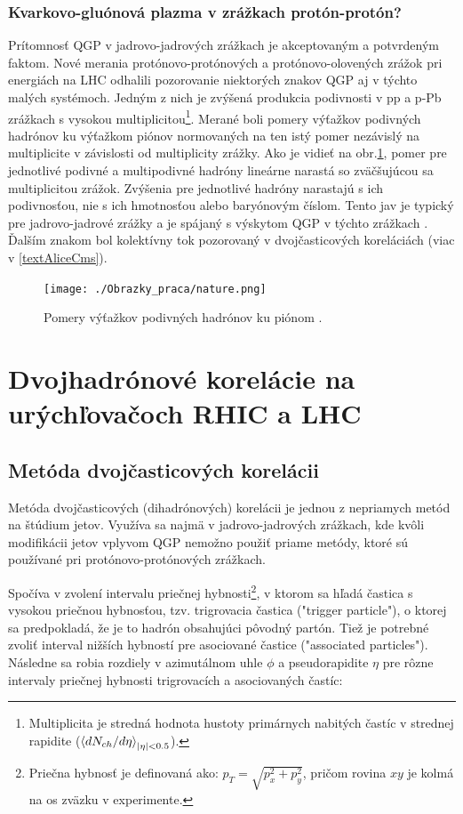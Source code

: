 \documentclass[thesismargins, thesislinespacing]{rnthesis}
\begin{document}
\subsection{Kvarkovo-gluónová plazma v zrážkach protón-protón?}
Prítomnosť QGP v jadrovo-jadrových zrážkach je akceptovaným a potvrdeným faktom. Nové merania protónovo-protónových a protónovo-olovených zrážok pri energiách na LHC odhalili pozorovanie niektorých znakov QGP aj v týchto malých systémoch. Jedným z nich je zvýšená produkcia podivnosti v pp a p-Pb zrážkach s vysokou multiplicitou\footnote{Multiplicita je stredná hodnota hustoty primárnych nabitých častíc v strednej rapidite   \newline  ($\braket{dN_{ch}/d\eta}_{|\eta|<0.5}$).}. Merané boli pomery výťažkov podivných hadrónov ku výťažkom piónov normovaných na ten istý pomer nezávislý na multiplicite v závislosti od multiplicity zrážky. Ako je vidieť na obr.\ref{strange}, pomer pre jednotlivé podivné a  multipodivné hadróny lineárne narastá so zväčšujúcou sa multiplicitou zrážok. Zvýšenia pre jednotlivé hadróny narastajú s ich podivnosťou, nie s ich hmotnosťou alebo baryónovým číslom. Tento jav je typický pre jadrovo-jadrové zrážky a je spájaný s výskytom QGP v týchto zrážkach \cite{nature}.  Ďalším znakom bol kolektívny tok pozorovaný v dvojčasticových koreláciách (viac v \ref{textAliceCms}).
\begin{figure}[hbtp!]
	\begin{center}
		\texttt{[image: ./Obrazky\_praca/nature.png]}
		\caption{ Pomery výťažkov podivných hadrónov ku piónom \cite{nature}.}
		\label{strange}
	\end{center}
\end{figure} 

\chapter{Dvojhadrónové korelácie na urýchľovačoch RHIC a LHC}

\section{Metóda dvojčasticových korelácii}
\label{korel}
Metóda dvojčasticových (dihadrónových) korelácii je jednou z nepriamych metód na štúdium jetov. Využíva sa najmä v jadrovo-jadrových zrážkach, kde kvôli \-mo\-di\-fi\-ká\-cii jetov vplyvom QGP nemožno použiť priame metódy, ktoré sú používané pri protónovo-protónových zrážkach.

Spočíva v zvolení intervalu priečnej hybnosti\footnote{Priečna hybnosť je definovaná ako: $p_T=\sqrt{p_x^2+p_y^2}$, pričom rovina $xy$ je kolmá na os zväzku v experimente.}, v ktorom sa hľadá častica s vysokou priečnou hybnosťou, tzv. trigrovacia častica ("trigger particle"), o ktorej sa predpokladá, že je to hadrón obsahujúci pôvodný partón. Tiež je potrebné zvoliť interval nižších hybností pre asociované častice ("\-associated particles"). Následne sa robia rozdiely v \-a\-zi\-mu\-tál\-nom uhle $\phi$ a pseudorapidite $\eta$ pre rôzne intervaly priečnej hybnosti trigrovacích a asociovaných častíc:
\end{document}
